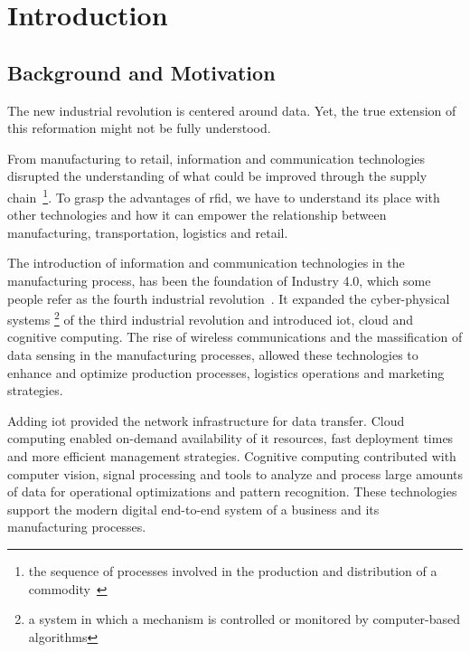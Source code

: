 
\chapter{Introduction}

\section{Background and Motivation}

The new industrial revolution is centered around data. Yet, the true extension of this reformation might not be fully understood.

From manufacturing to retail, information and communication technologies disrupted the understanding of what could be improved through the supply chain~\footnote{the sequence of processes involved in the production and distribution of a commodity~\cite{OxfordLanguagesGoogle}}. 
To grasp the advantages of \ac{rfid}, we have to understand its place with other technologies and how it can empower the relationship between manufacturing, transportation, logistics and retail.

The introduction of information and communication technologies in the manufacturing process, has been the foundation of Industry 4.0, which some people refer as the fourth industrial revolution~\cite{marrWhatIndustryHere}. It expanded the cyber-physical systems \footnote{a system in which a mechanism is controlled or monitored by computer-based algorithms} of the third industrial revolution and introduced \ac{iot}, cloud and cognitive computing.
The rise of wireless communications and the massification of data sensing in the manufacturing processes, allowed these technologies to enhance and optimize production processes, logistics operations and marketing strategies.

Adding \ac{iot} provided the network infrastructure for data transfer. Cloud computing enabled on-demand availability of \ac{it} resources, fast deployment times and more efficient management strategies. Cognitive computing contributed with computer vision, signal processing and tools to analyze and process large amounts of data for operational optimizations and pattern recognition.
These technologies support the modern digital end-to-end system of a business and its manufacturing processes.

